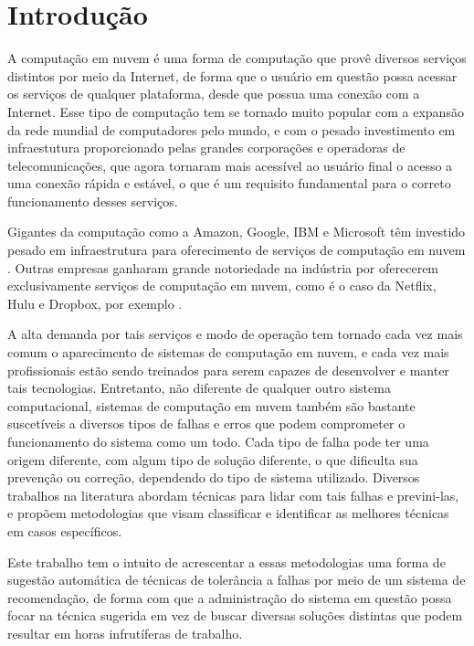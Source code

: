 \documentclass[
	12pt,				%
	openright,			%
	twoside,			%
	a4paper,			%
	english,			%
	french,				%
	spanish,			%
	brazil				%
	]{abntex2}
\begin{document}
\chapter{Introdução}
A computação em nuvem é uma forma de computação que provê diversos serviços distintos por meio da Internet, de forma que o usuário em questão possa acessar os serviços de qualquer plataforma, desde que possua uma conexão com a Internet. Esse tipo de computação tem se tornado muito popular com a expansão da rede mundial de computadores pelo mundo, e com o pesado investimento em infraestutura proporcionado pelas grandes corporações e operadoras de telecomunicações, que agora tornaram mais acessível ao usuário final o acesso a uma conexão rápida e estável, o que é um requisito fundamental para o correto funcionamento desses serviços.

Gigantes da computação como a Amazon, Google, IBM e Microsoft têm investido pesado em infraestrutura para oferecimento de serviços de computação em nuvem \cite{tsai2010service}\cite{lohr2007google}. Outras empresas ganharam grande notoriedade na indústria por oferecerem exclusivamente serviços de computação em nuvem, como é o caso da Netflix, Hulu e Dropbox, por exemplo \cite{berman2012cloud}. 

A alta demanda por tais serviços e modo de operação tem tornado cada vez mais comum o aparecimento de sistemas de computação em nuvem, e cada vez mais profissionais estão sendo treinados para serem capazes de desenvolver e manter tais tecnologias. Entretanto, não diferente de qualquer outro sistema computacional, sistemas de computação em nuvem também são bastante suscetíveis a diversos tipos de falhas e erros que podem comprometer o funcionamento do sistema como um todo. Cada tipo de falha pode ter uma origem diferente, com algum tipo de solução diferente, o que dificulta sua prevenção ou correção, dependendo do tipo de sistema utilizado. Diversos trabalhos na literatura abordam técnicas para lidar com tais falhas e previni-las, e propõem metodologias que visam classificar e identificar as melhores técnicas em casos específicos.

Este trabalho tem o intuito de acrescentar a essas metodologias uma forma de sugestão automática de técnicas de tolerância a falhas por meio de um sistema de recomendação, de forma com que a administração do sistema em questão possa focar na técnica sugerida em vez de buscar diversas soluções distintas que podem resultar em horas infrutíferas de trabalho.
\end{document}
